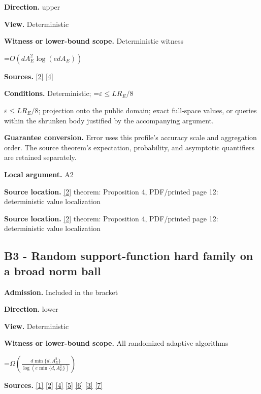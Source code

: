 \documentclass[10pt,a4paper]{article}
\newcommand{\AtlasMath}[1]{\par\begingroup\centering\setbox0=\hbox{$\displaystyle #1$}\ifdim\wd0>1.4\linewidth\typeout{ATLAS WIDE FORMULA: \the\wd0}\fi\ifdim\wd0>\linewidth\resizebox{\linewidth}{!}{\box0}\else\box0\fi\par\endgroup}
\newcommand{\AtlasInlineMath}[1]{\begingroup\setbox0=\hbox{$#1$}\ifdim\wd0>.4\linewidth\endgroup\AtlasMath{#1}\else\endgroup$#1$\fi}
\begin{document}
\textbf{Direction.} upper

\textbf{View.} Deterministic

\textbf{Witness or lower-bound scope.} Deterministic witness

\AtlasMath{O\!\left(dA_E^2\log(edA_E)\right)}
\textbf{Sources.} \href{https://arxiv.org/html/2607.16558v2}{[2]} \href{https://www.mathnet.ru/php/archive.phtml?jrnid=mzm&option_lang=eng&paperid=1697&wshow=paper}{[4]}

\textbf{Conditions.} Deterministic; \AtlasInlineMath{\varepsilon\le LR_E/8}; projection onto the public domain; exact full-space values, or queries within the shrunken body justified by the accompanying argument.

\textbf{Guarantee conversion.} Error uses this profile's accuracy scale and aggregation order. The source theorem's expectation, probability, and asymptotic quantifiers are retained separately.

\textbf{Local argument.} A2

\textbf{Source location.} \href{https://arxiv.org/html/2607.16558v2}{[2]} theorem: Proposition 4, PDF/printed page 12: deterministic value localization

\textbf{Source location.} \href{https://arxiv.org/html/2607.16558v2}{[2]} theorem: Proposition 4, PDF/printed page 12: deterministic value localization

\subsection{B3 - Random support-function hard family on a broad norm ball}
\textbf{Admission.} Included in the bracket

\textbf{Direction.} lower

\textbf{View.} Deterministic

\textbf{Witness or lower-bound scope.} All randomized adaptive algorithms

\AtlasMath{\Omega\!\left(\frac{d\min\{d,A_E^2\}}{\log(e\min\{d,A_E^2\})}\right)}
\textbf{Sources.} \href{https://arxiv.org/html/2610.00345v1}{[1]} \href{https://arxiv.org/html/2607.16558v2}{[2]} \href{https://www.mathnet.ru/php/archive.phtml?jrnid=mzm&option_lang=eng&paperid=1697&wshow=paper}{[4]} \href{https://arxiv.org/abs/1802.09022}{[5]} \href{https://proceedings.neurips.cc/paper_files/paper/2022/file/329ef22fd8cb68223d5df09a037f7dd9-Paper-Conference.pdf}{[6]} \href{https://jmlr.org/papers/volume18/16-632/16-632.pdf}{[3]} \href{https://arxiv.org/pdf/1707.08486v2}{[7]}
\end{document}
